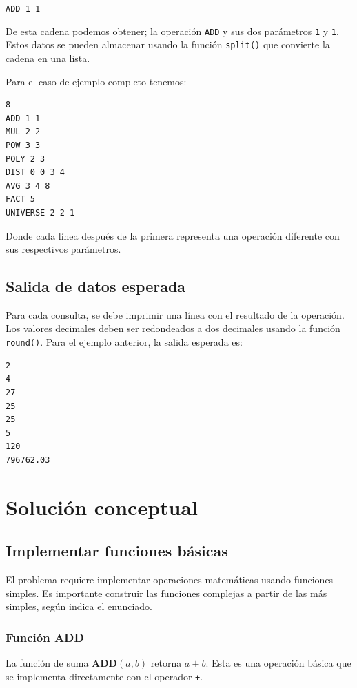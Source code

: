 \documentclass{article}
\begin{document}
\texttt{ADD 1 1}

De esta cadena podemos obtener; la operación \texttt{ADD} y sus dos parámetros \texttt{1} y \texttt{1}. Estos datos se pueden almacenar usando la función \lstinline[style=pythonstyle]|split()| que convierte la cadena en una lista.

Para el caso de ejemplo completo tenemos:

\begin{verbatim}
8
ADD 1 1
MUL 2 2
POW 3 3
POLY 2 3
DIST 0 0 3 4
AVG 3 4 8
FACT 5
UNIVERSE 2 2 1
\end{verbatim}

Donde cada línea después de la primera representa una operación diferente con sus respectivos parámetros.

\subsection{Salida de datos esperada}

Para cada consulta, se debe imprimir una línea con el resultado de la operación. Los valores decimales deben ser redondeados a dos decimales usando la función \lstinline[style=pythonstyle]|round()|. Para el ejemplo anterior, la salida esperada es:

\begin{verbatim}
2
4
27
25
25
5
120
796762.03
\end{verbatim} 

\section{Solución conceptual}

\subsection{Implementar funciones básicas}
\label{sec:funciones-basicas}

El problema requiere implementar operaciones matemáticas usando funciones simples. Es importante construir las funciones complejas a partir de las más simples, según indica el enunciado.

\subsubsection{Función ADD}

La función de suma \textbf{ADD}\((a,b)\) retorna \(a + b\). Esta es una operación básica que se implementa directamente con el operador \texttt{+}.
\end{document}
